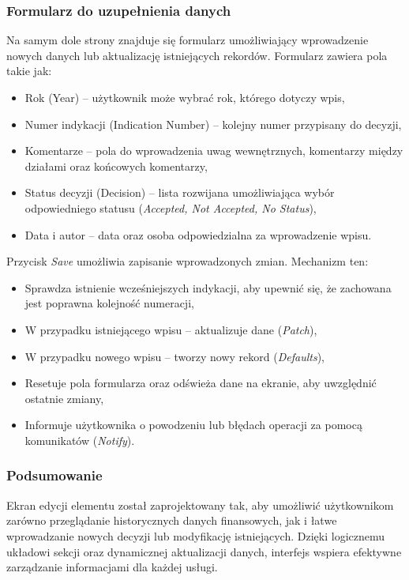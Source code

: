 \subsubsection{Formularz do uzupełnienia danych}
Na samym dole strony znajduje się formularz umożliwiający wprowadzenie nowych danych lub aktualizację istniejących rekordów. Formularz zawiera pola takie jak:
\begin{itemize}
   \item {Rok (Year)} -- użytkownik może wybrać rok, którego dotyczy wpis,
   \item {Numer indykacji (Indication Number)} -- kolejny numer przypisany do decyzji,
   \item {Komentarze} -- pola do wprowadzenia uwag wewnętrznych, komentarzy między działami oraz końcowych komentarzy,
   \item {Status decyzji (Decision)} -- lista rozwijana umożliwiająca wybór odpowiedniego statusu (\textit{Accepted, Not Accepted, No Status}),
   \item {Data i autor} -- data oraz osoba odpowiedzialna za wprowadzenie wpisu.
\end{itemize}

Przycisk \textit{Save} umożliwia zapisanie wprowadzonych zmian. Mechanizm ten:
\begin{itemize}
   \item Sprawdza istnienie wcześniejszych indykacji, aby upewnić się, że zachowana jest poprawna kolejność numeracji,
   \item W przypadku istniejącego wpisu -- aktualizuje dane (\textit{Patch}),
   \item W przypadku nowego wpisu -- tworzy nowy rekord (\textit{Defaults}),
   \item Resetuje pola formularza oraz odświeża dane na ekranie, aby uwzględnić ostatnie zmiany,
   \item Informuje użytkownika o powodzeniu lub błędach operacji za pomocą komunikatów (\textit{Notify}).
\end{itemize}

\subsubsection{Podsumowanie}
Ekran edycji elementu został zaprojektowany tak, aby umożliwić użytkownikom zarówno przeglądanie historycznych danych finansowych, jak i łatwe wprowadzanie nowych decyzji lub modyfikację istniejących. Dzięki logicznemu układowi sekcji oraz dynamicznej aktualizacji danych, interfejs wspiera efektywne zarządzanie informacjami dla każdej usługi.
